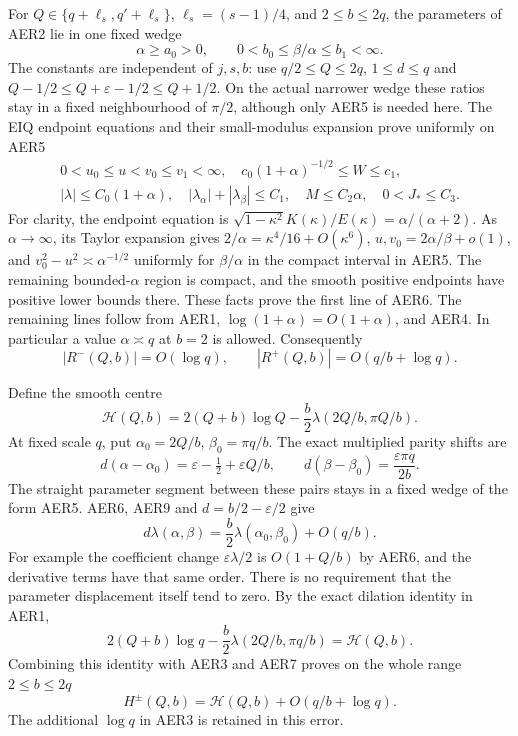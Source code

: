 For $Q\in\{q+\ell_s,q'+\ell_s\}$, $\ell_s=(s-1)/4$, and
$2\le b\le2q$, the parameters of AER2 lie in one fixed wedge
\[
 \alpha\ge a_0>0,\qquad
 0<b_0\le\beta/\alpha\le b_1<\infty.                  \tag{AER5}
\]
The constants are independent of $j,s,b$: use $q/2\le Q\le2q$,
$1\le d\le q$ and $Q-1/2\le Q+\varepsilon-1/2\le Q+1/2$.
On the actual narrower wedge these ratios stay in a fixed
neighbourhood of $\pi/2$, although only AER5 is needed here.
The EIQ endpoint equations and their small-modulus expansion prove
uniformly on AER5
\[
\begin{gathered}
 0<u_0\le u<v_0\le v_1<\infty,\quad
 c_0(1+\alpha)^{-1/2}\le W\le c_1,\\
 |\lambda|\le C_0(1+\alpha),\quad
 |\lambda_\alpha|+|\lambda_\beta|\le C_1,
 \quad M\le C_2\alpha,\quad 0<J_*\le C_3.
\end{gathered}\tag{AER6}
\]
For clarity, the endpoint equation is
$\sqrt{1-\kappa^2}K(\kappa)/E(\kappa)=\alpha/(\alpha+2)$.
As $\alpha\to\infty$, its Taylor expansion gives
$2/\alpha=\kappa^4/16+O(\kappa^6)$,
$u,v_0=2\alpha/\beta+o(1)$, and
$v_0^2-u^2\asymp\alpha^{-1/2}$ uniformly for
$\beta/\alpha$ in the compact interval in AER5.
The remaining bounded-$\alpha$ region is compact, and the smooth
positive endpoints have positive lower bounds there.  These facts
prove the first line of AER6.  The remaining lines follow from AER1,
$\log(1+\alpha)=O(1+\alpha)$, and AER4.  In particular a value
$\alpha\asymp q$ at $b=2$ is allowed.
Consequently
\[
 |R^-(Q,b)|=O(\log q),\qquad
 |R^+(Q,b)|=O(q/b+\log q).                             \tag{AER7}
\]

Define the smooth centre
\[
 \mathcal H(Q,b)=2(Q+b)\log Q
                 -\frac b2\lambda(2Q/b,\pi Q/b).       \tag{AER8}
\]
At fixed scale $q$, put $\alpha_0=2Q/b$, $\beta_0=\pi q/b$.
The exact multiplied parity shifts are
\[
 d(\alpha-\alpha_0)=\varepsilon-\tfrac12
                         +\varepsilon Q/b,\qquad
 d(\beta-\beta_0)=\frac{\varepsilon\pi q}{2b}.           \tag{AER9}
\]
The straight parameter segment between these pairs stays in a fixed
wedge of the form AER5.  AER6, AER9 and $d=b/2-\varepsilon/2$ give
\[
 d\lambda(\alpha,\beta)
        =\frac b2\lambda(\alpha_0,\beta_0)+O(q/b).
\]
For example the coefficient change $\varepsilon\lambda/2$ is
$O(1+Q/b)$ by AER6, and the derivative terms have that same order.
There is no requirement that the parameter displacement itself
tend to zero.  By the exact dilation identity in AER1,
\[
 2(Q+b)\log q-\frac b2\lambda(2Q/b,\pi q/b)
                       =\mathcal H(Q,b).
\]
Combining this identity with AER3 and AER7 proves on the whole range
$2\le b\le2q$
\[
 H^\pm(Q,b)=\mathcal H(Q,b)+O(q/b+\log q).              \tag{AER10}
\]
The additional $\log q$ in AER3 is retained in this error.

